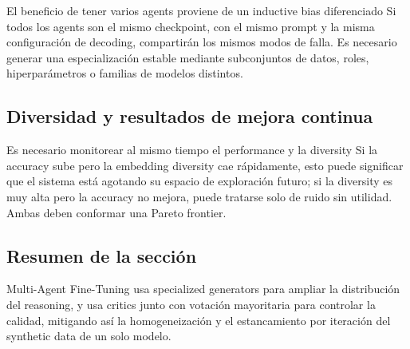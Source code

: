\documentclass[a4paper]{article}
\begin{document}
\begin{importantbox}{El beneficio de tener varios agents proviene de un inductive bias diferenciado}
Si todos los agents son el mismo checkpoint, con el mismo prompt y la misma configuración de decoding, compartirán los mismos modos de falla. Es necesario generar una especialización estable mediante subconjuntos de datos, roles, hiperparámetros o familias de modelos distintos.
\end{importantbox}

\subsection{Diversidad y resultados de mejora continua}




\begin{knowledgebox}{Es necesario monitorear al mismo tiempo el performance y la diversity}
Si la accuracy sube pero la embedding diversity cae rápidamente, esto puede significar que el sistema está agotando su espacio de exploración futuro; si la diversity es muy alta pero la accuracy no mejora, puede tratarse solo de ruido sin utilidad. Ambas deben conformar una Pareto frontier.
\end{knowledgebox}

\subsection{Resumen de la sección}

Multi-Agent Fine-Tuning usa specialized generators para ampliar la distribución del reasoning, y usa critics junto con votación mayoritaria para controlar la calidad, mitigando así la homogeneización y el estancamiento por iteración del synthetic data de un solo modelo.
\end{document}
